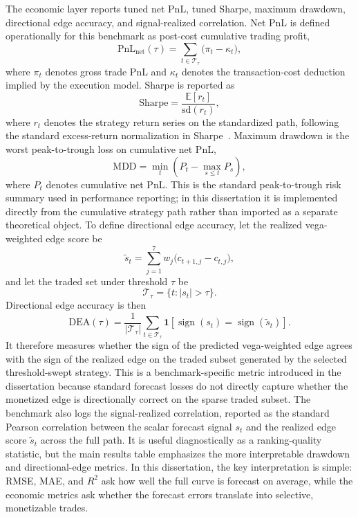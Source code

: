 \documentclass[12pt]{report}
\begin{document}
The economic layer reports tuned net PnL, tuned Sharpe, maximum drawdown, directional edge accuracy, and signal-realized correlation. Net PnL is defined operationally for this benchmark as post-cost cumulative trading profit,
\[
\mathrm{PnL}_{\mathrm{net}}(\tau)=\sum_{t\in\mathcal{T}_\tau}\big(\pi_t-\kappa_t\big),
\]
where \(\pi_t\) denotes gross trade PnL and \(\kappa_t\) denotes the transaction-cost deduction implied by the execution model. Sharpe is reported as
\[
\mathrm{Sharpe}=\frac{\mathbb{E}[r_t]}{\mathrm{sd}(r_t)},
\]
where \(r_t\) denotes the strategy return series on the standardized path, following the standard excess-return normalization in Sharpe~\citep{sharpe1994}. Maximum drawdown is the worst peak-to-trough loss on cumulative net PnL,
\[
\mathrm{MDD}=\min_t\left(P_t-\max_{s\le t}P_s\right),
\]
where \(P_t\) denotes cumulative net PnL. This is the standard peak-to-trough risk summary used in performance reporting; in this dissertation it is implemented directly from the cumulative strategy path rather than imported as a separate theoretical object. To define directional edge accuracy, let the realized vega-weighted edge score be
\[
\tilde{s}_t=\sum_{j=1}^{7} w_j \big(c_{t+1,j}-c_{t,j}\big),
\]
and let the traded set under threshold \(\tau\) be
\[
\mathcal{T}_\tau=\{t:\lvert s_t\rvert>\tau\}.
\]
Directional edge accuracy is then
\[
\mathrm{DEA}(\tau)=\frac{1}{|\mathcal{T}_\tau|}\sum_{t\in\mathcal{T}_\tau}\mathbf{1}\!\left[\operatorname{sign}(s_t)=\operatorname{sign}(\tilde{s}_t)\right].
\]
It therefore measures whether the sign of the predicted vega-weighted edge agrees with the sign of the realized edge on the traded subset generated by the selected threshold-swept strategy. This is a benchmark-specific metric introduced in the dissertation because standard forecast losses do not directly capture whether the monetized edge is directionally correct on the sparse traded subset. The benchmark also logs the signal-realized correlation, reported as the standard Pearson correlation between the scalar forecast signal \(s_t\) and the realized edge score \(\tilde{s}_t\) across the full path. It is useful diagnostically as a ranking-quality statistic, but the main results table emphasizes the more interpretable drawdown and directional-edge metrics. In this dissertation, the key interpretation is simple: RMSE, MAE, and \(R^2\) ask how well the full curve is forecast on average, while the economic metrics ask whether the forecast errors translate into selective, monetizable trades.
\end{document}
